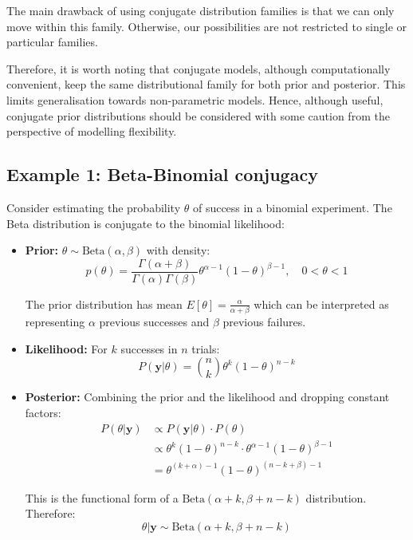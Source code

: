 The main drawback of using conjugate distribution families is that we can only move within this family. Otherwise, our possibilities are not restricted to single or particular families.

Therefore, it is worth noting that conjugate models, although computationally convenient, keep the same distributional family for both prior and posterior. This limits generalisation towards non-parametric models. Hence, although useful, conjugate prior distributions should be considered with some caution from the perspective of modelling flexibility.

\subsection{Example 1: Beta-Binomial conjugacy}
\begin{examplebox}
\begin{example}

Consider estimating the probability $\theta$ of success in a binomial experiment. The Beta distribution is conjugate to the binomial likelihood:

\begin{itemize}
\item \textbf{Prior:} $\theta \sim \text{Beta}(\alpha, \beta)$ with density:
$$p(\theta) = \frac{\Gamma(\alpha + \beta)}{\Gamma(\alpha)\Gamma(\beta)} \theta^{\alpha-1}(1-\theta)^{\beta-1}, \quad 0 < \theta < 1$$

The prior distribution has mean $E[\theta] = \frac{\alpha}{\alpha+\beta}$ which can be interpreted as representing $\alpha$ previous successes and $\beta$ previous failures.

\item \textbf{Likelihood:} For $k$ successes in $n$ trials:
$$P(\mathbf{y}|\theta) = \binom{n}{k} \theta^k (1-\theta)^{n-k}$$

\item \textbf{Posterior:} Combining the prior and the likelihood and dropping constant factors:
\begin{align*}
P(\theta|\mathbf{y}) &\propto P(\mathbf{y}|\theta) \cdot P(\theta) \\
&\propto \theta^k (1-\theta)^{n-k} \cdot \theta^{\alpha-1}(1-\theta)^{\beta-1} \\
&= \theta^{(k+\alpha)-1} (1-\theta)^{(n-k+\beta)-1}
\end{align*}

This is the functional form of a $\text{Beta}(\alpha + k, \beta + n - k)$ distribution. Therefore:
$$\theta|\mathbf{y} \sim \text{Beta}(\alpha + k, \beta + n - k)$$
\end{itemize}


\end{example}
\end{examplebox}
